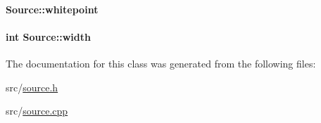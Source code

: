 \hypertarget{classSource_a08ffcbc3671134eeac92c71de15c2e37}{
\paragraph[{whitepoint}]{ {\bf \-Source\-::whitepoint}}}\label{classSource_a08ffcbc3671134eeac92c71de15c2e37}
\hypertarget{classSource_a4cead9f95c3faf3f77ea3854ab2a7f10}{
\paragraph[{width}]{\setlength{\rightskip}{0pt plus 5cm}int {\bf \-Source\-::width}}}\label{classSource_a4cead9f95c3faf3f77ea3854ab2a7f10}


\-The documentation for this class was generated from the following files\-:\begin{DoxyCompactItemize}
\item 
src/\hyperlink{source_8h}{source.\-h}\item 
src/\hyperlink{source_8cpp}{source.\-cpp}\end{DoxyCompactItemize}
